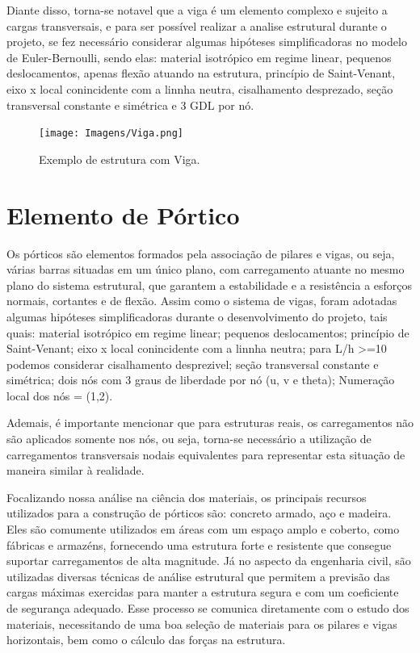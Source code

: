 \documentclass[deposito, acronym, symbols]{fei}
\begin{document}
Diante disso, torna-se notavel que a viga é um elemento complexo e sujeito a cargas transversais, e para ser possível realizar a analise estrutural durante o projeto, se fez necessário considerar algumas hipóteses simplificadoras no modelo de Euler-Bernoulli, sendo elas: material isotrópico em regime linear, pequenos deslocamentos, apenas flexão atuando na estrutura, princípio de Saint-Venant, eixo x local conincidente com a linnha neutra, cisalhamento desprezado, seção transversal constante e simétrica e 3 GDL por nó.

\begin{figure}[!htb]
 \centering
    \caption{Exemplo de estrutura com Viga.}
    \texttt{[image: Imagens/Viga.png]}
    \label{fig: Estrutura Viga}
 \end{figure}

\section{Elemento de Pórtico}

Os pórticos são elementos formados pela associação de pilares e vigas, ou seja, várias barras situadas em um único plano, com carregamento atuante no mesmo plano do sistema estrutural, que garantem a estabilidade e a resistência a esforços normais, cortantes e de flexão.
Assim como o sistema de vigas, foram adotadas algumas hipóteses simplificadoras durante o desenvolvimento do projeto, tais quais: material isotrópico em regime linear; pequenos deslocamentos; princípio de Saint-Venant; eixo x local conincidente com a linnha neutra; para L/h >=10 podemos considerar cisalhamento desprezivel; seção transversal constante e simétrica; dois nós com 3 graus de liberdade por nó (u, v e theta); Numeração local dos nós = (1,2). 

Ademais, é importante mencionar que para estruturas reais, os carregamentos não são aplicados somente nos nós, ou seja, torna-se necessário a utilização de carregamentos transversais nodais equivalentes para representar esta situação de maneira similar à realidade.

Focalizando nossa análise na ciência dos materiais, os principais recursos utilizados para a construção de pórticos são: concreto armado, aço e madeira. Eles são comumente utilizados em áreas com um espaço amplo e coberto, como fábricas e armazéns, fornecendo uma estrutura forte e resistente que consegue suportar carregamentos de alta magnitude. 
Já no aspecto da engenharia civil, são utilizadas diversas técnicas de análise estrutural que permitem a previsão das cargas máximas exercidas para manter a estrutura segura e com um coeficiente de segurança adequado. Esse processo se comunica diretamente com o estudo dos materiais, necessitando de uma boa seleção de materiais para os pilares e vigas horizontais, bem como o cálculo das forças na estrutura.
\end{document}
